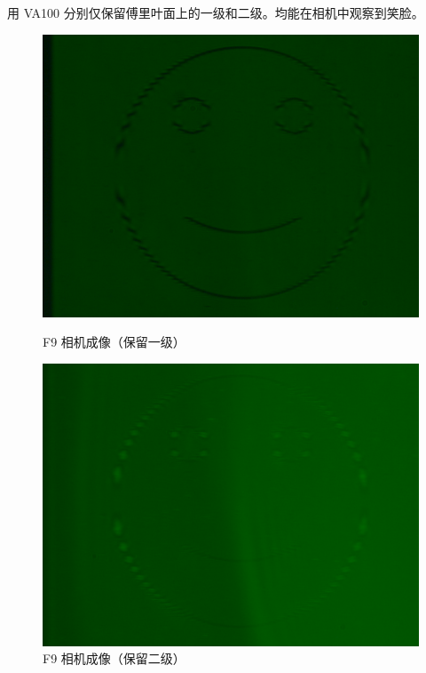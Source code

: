 \documentclass{ctexart}
\begin{document}
用 VA100 分别仅保留傅里叶面上的一级和二级。均能在相机中观察到笑脸。
\begin{figure}[H]
  \centering
  \begin{minipage}[b]{0.3\textwidth}
    \centering
    \includegraphics[width=\textwidth]{pictures/F9-mask1-Ex16.png}
    \caption{F9 相机成像（保留一级）}
  \end{minipage}
  \hspace{0.1\textwidth} %
  \begin{minipage}[b]{0.3\textwidth}
    \centering
    \includegraphics[width=\textwidth]{pictures/F9-mask2-Ex16.png}
    \caption{F9 相机成像（保留二级）}
  \end{minipage}
\end{figure}
\end{document}
